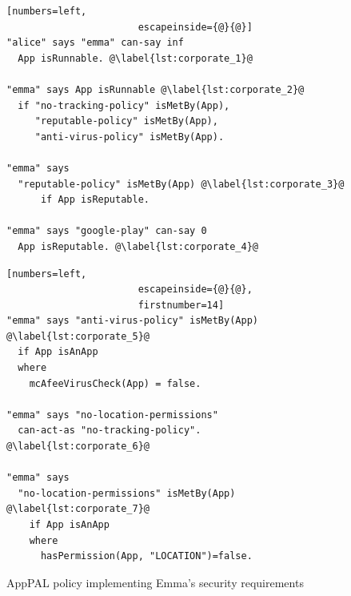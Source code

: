 \documentclass[]{scrartcl}
\begin{document}
\begin{figure}
  \begin{minipage}[t]{0.5\textwidth}
    \begin{lstlisting}[numbers=left,
                       escapeinside={@}{@}]
"alice" says "emma" can-say inf
  App isRunnable. @\label{lst:corporate_1}@

"emma" says App isRunnable @\label{lst:corporate_2}@
  if "no-tracking-policy" isMetBy(App),
     "reputable-policy" isMetBy(App),
     "anti-virus-policy" isMetBy(App).

"emma" says
  "reputable-policy" isMetBy(App) @\label{lst:corporate_3}@
      if App isReputable.

"emma" says "google-play" can-say 0
  App isReputable. @\label{lst:corporate_4}@
    \end{lstlisting}
  \end{minipage}\begin{minipage}[t]{0.5\textwidth}
    \begin{lstlisting}[numbers=left,
                       escapeinside={@}{@},
                       firstnumber=14]
"emma" says "anti-virus-policy" isMetBy(App) @\label{lst:corporate_5}@
  if App isAnApp
  where
    mcAfeeVirusCheck(App) = false.

"emma" says "no-location-permissions"
  can-act-as "no-tracking-policy". @\label{lst:corporate_6}@

"emma" says
  "no-location-permissions" isMetBy(App) @\label{lst:corporate_7}@
    if App isAnApp
    where
      hasPermission(App, "LOCATION")=false.
\end{lstlisting}
\end{minipage}
\caption{AppPAL policy implementing Emma's security requirements}
\label{lst:corporate}
\end{figure}
\end{document}
